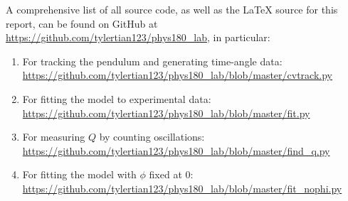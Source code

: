 \documentclass[aps,twocolumn,secnumarabic,nobalancelastpage,amsmath,amssymb,nofootinbib]{revtex4}
\begin{document}
A comprehensive list of all source code, as well as the \LaTeX{} source for this report, can be found on GitHub at
\url{https://github.com/tylertian123/phys180_lab}, in particular:
\label{appendix:code}
\begin{enumerate}
    \item For tracking the pendulum and generating time-angle data: \url{https://github.com/tylertian123/phys180_lab/blob/master/cvtrack.py}
    \item For fitting the model to experimental data: \url{https://github.com/tylertian123/phys180_lab/blob/master/fit.py}
    \item For measuring \(Q\) by counting oscillations: \url{https://github.com/tylertian123/phys180_lab/blob/master/find_q.py}
    \item For fitting the model with \(\phi\) fixed at 0: \url{https://github.com/tylertian123/phys180_lab/blob/master/fit_nophi.py}
\end{enumerate}
\end{document}
